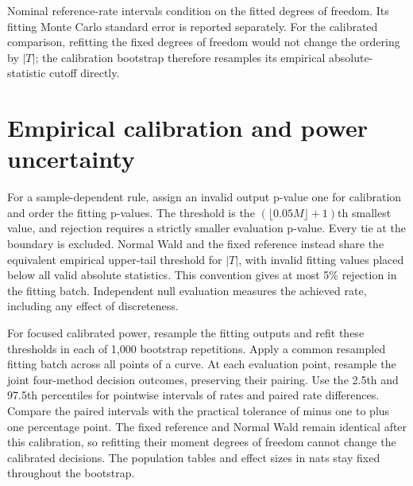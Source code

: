 Nominal reference-rate intervals condition on the fitted degrees of
freedom. Its fitting Monte Carlo standard error is reported separately.
For the calibrated comparison, refitting the fixed degrees of freedom
would not change the ordering by \(|T|\); the calibration bootstrap
therefore resamples its empirical absolute-statistic cutoff directly.

\section{Empirical calibration and power uncertainty}

For a sample-dependent rule, assign an invalid output p-value one for
calibration and order the fitting p-values. The threshold is the
\((\lfloor0.05M\rfloor+1)\)th smallest value, and rejection requires a
strictly smaller evaluation p-value. Every tie at the boundary is
excluded. Normal Wald and the fixed reference instead share the equivalent
empirical upper-tail threshold for \(|T|\), with invalid fitting values
placed below all valid absolute statistics. This convention gives at most
5\% rejection in the fitting batch. Independent null evaluation measures
the achieved rate, including any effect of discreteness.

For focused calibrated power, resample the fitting outputs and refit
these thresholds in each of 1,000 bootstrap repetitions. Apply a common
resampled fitting batch across all points of a curve. At each evaluation
point, resample the joint four-method decision outcomes, preserving their
pairing. Use the 2.5th and 97.5th percentiles for pointwise intervals of
rates and paired rate differences. Compare the paired intervals with the
practical tolerance of minus one to plus one percentage point.
The fixed reference and Normal Wald
remain identical after this calibration, so refitting their moment degrees
of freedom cannot change the calibrated decisions. The population tables
and effect sizes in nats stay fixed throughout the bootstrap.
